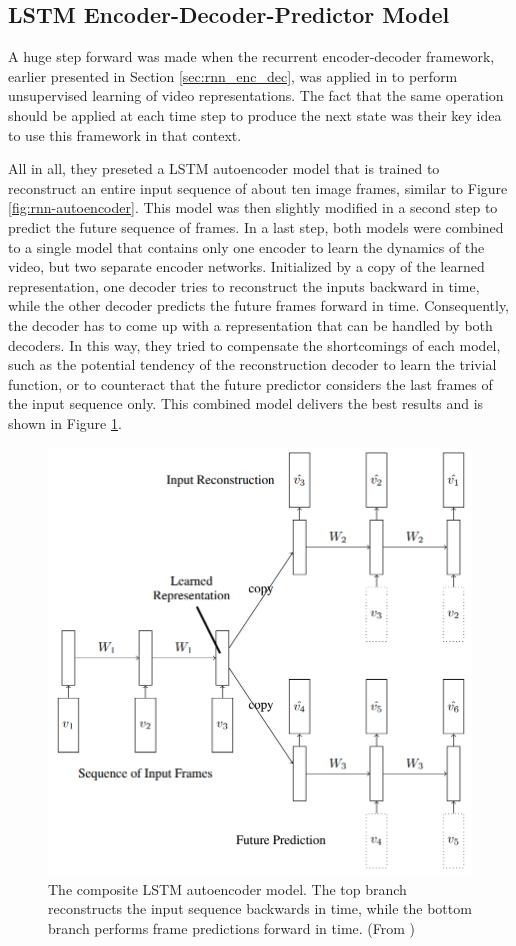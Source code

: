 \subsection{LSTM Encoder-Decoder-Predictor Model}

A huge step forward was made when the recurrent encoder-decoder framework, earlier presented in Section \ref{sec:rnn_enc_dec}, was applied in \parencite{unsup_learn_lstm} to perform unsupervised learning of video representations. The fact that the same operation should be applied at each time step to produce the next state was their key idea to use this framework in that context. 

All in all, they preseted a LSTM autoencoder model that is trained to reconstruct an entire input sequence of about ten image frames, similar to Figure \ref{fig:rnn-autoencoder}. This model was then slightly modified in a second step to predict the future sequence of frames. In a last step, both models were combined to a single model that contains only one encoder to learn the dynamics of the video, but two separate encoder networks. Initialized by a copy of the learned representation, one decoder tries to reconstruct the inputs backward in time, while the other decoder predicts the future frames forward in time. Consequently, the decoder has to come up with a representation that can be handled by both decoders. In this way, they tried to compensate the shortcomings of each model, such as the potential tendency of the reconstruction decoder to learn the trivial function, or to counteract that the future predictor considers the last frames of the input sequence only. This combined model delivers the best results and is shown in Figure \ref{fig:lstm_combo}.

\begin{figure}[htb]
	\centering
	\includegraphics[width=0.5\linewidth]{figures/related/combo_shrinked.png} 
	\caption[Composite LSTM Autoencoder Model]{The composite LSTM autoencoder model. The top branch reconstructs the input sequence backwards in time, while the bottom branch performs frame predictions forward in time. (From \parencite{unsup_learn_lstm})} \label{fig:lstm_combo}
\end{figure}

